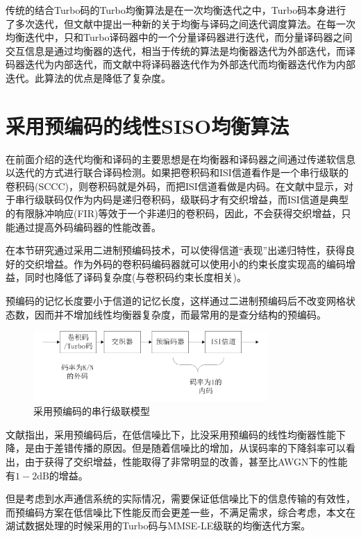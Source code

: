 传统的结合Turbo码的Turbo均衡算法是在一次均衡迭代之中，Turbo码本身进行了多次迭代，但文献中提出一种新的关于均衡与译码之间迭代调度算法。在每一次均衡迭代中，只和Turbo译码器中的一个分量译码器进行迭代，而分量译码器之间交互信息是通过均衡器的迭代，相当于传统的算法是均衡器迭代为外部迭代，而译码器迭代为内部迭代，而文献中将译码器迭代作为外部迭代而均衡器迭代作为内部迭代。此算法的优点是降低了复杂度。
\section{采用预编码的线性SISO均衡算法}
在前面介绍的迭代均衡和译码的主要思想是在均衡器和译码器之间通过传递软信息以迭代的方式进行联合译码检测。如果把卷积码和ISI信道看作是一个串行级联的卷积码(SCCC)\cite{Benedetto1998}，则卷积码就是外码，而把ISI信道看做是内码。在文献中显示，对于串行级联码仅作为内码是递归卷积码，级联码才有交织增益，而ISI信道是典型的有限脉冲响应(FIR)等效于一个非递归的卷积码，因此，不会获得交织增益，只能通过提高外码编码器的性能改善。

在本节研究通过采用二进制预编码技术，可以使得信道“表现”出递归特性，获得良好的交织增益。作为外码的卷积码编码器就可以使用小的约束长度实现高的编码增益，同时也降低了译码复杂度(与卷积码约束长度相关)。

预编码的记忆长度要小于信道的记忆长度，这样通过二进制预编码后不改变网格状态数，因而并不增加线性均衡器复杂度，而最常用的是查分结构的预编码。
\begin{figure}[htb]
  \begin{center}
    \includegraphics[width=0.8\textwidth]{images/diffcoder.pdf}
  \end{center}
  \caption{采用预编码的串行级联模型}
  \label{fig:3.8}
\end{figure}

文献指出，采用预编码后，在低信噪比下，比没采用预编码的线性均衡器性能下降，是由于差错传播的原因。但是随着信噪比的增加，从误码率的下降斜率可以看出，由于获得了交织增益，性能取得了非常明显的改善，甚至比AWGN下的性能有$1-2\mbox{dB}$的增益。

但是考虑到水声通信系统的实际情况，需要保证低信噪比下的信息传输的有效性，而预编码方案在低信噪比下性能反而会更差一些，不满足需求，综合考虑，本文在湖试数据处理的时候采用的Turbo码与MMSE-LE级联的均衡迭代方案。

